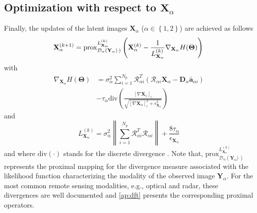 \documentclass[review]{elsarticle}
\newcommand{\Npatch}{N_{\mathrm{p}}}
\begin{document}
\subsection{Optimization with respect to \texorpdfstring{$\mathbf{X}_{\alpha}$}{X}}

Finally, the updates of the latent images $\mathbf{X}_{\alpha}$ ($\alpha \in \left\{1,2\right\}$) are achieved as follows
\begin{equation}
 		\mathbf{X}_{\alpha}^{(k+1)} = \mathrm{prox}^{L_{\mathbf{X}_{\mathrm{\alpha}}}^{(k)}}_{\mathcal{D}_{\mathrm{\alpha}}(\mathbf{Y}_{\mathrm{\alpha}}|\cdot)}\left(\mathbf{X}_{\alpha}^{(k)} - \frac{1}{L_{\mathbf{X}_{\alpha}}^{(k)} }\nabla_{\mathbf{X}_{\alpha}} H(\boldsymbol{\Theta}) \right)
       	\label{eq:latent_Update}\\
\end{equation}
with
\begin{equation}
\begin{aligned}
\nabla_{\mathbf{X}_{\alpha}}H(\boldsymbol{\Theta}) &= \sigma_{\alpha}^2\sum_{i=1}^{\Npatch}\mathcal{R}_{\alpha{i}}^{T}\left(\mathcal{R}_{\alpha{i}}\mathbf{X}_{\alpha} - \mathbf{D}_{\alpha}\bar{\mathbf{a}}_{\alpha{i}}\right) \\
       &- \tau_{\alpha}\mathrm{div}\left( \frac{\left[\nabla\mathbf{X}_{1}\right]_{i}}{\sqrt{\left[\nabla\mathbf{X}_{\alpha}\right]_{i}^{2} + \epsilon_{\mathbf{X}_{\alpha}}^{2}}}\right)
        \label{eq:nabla_latent}
        \end{aligned}
\end{equation}
and
\begin{equation}
		L_{\mathbf{X}_{\mathrm{\alpha}}}^{(k)} = \sigma_{\mathrm{\alpha}}^{2}\left\|\sum_{i=1}^{\Npatch}\mathcal{R}_{\alpha i}^{T}\mathcal{R}_{\alpha i}\right\|+ \frac{8\tau_{\mathrm{\alpha}}}{\epsilon_{\mathbf{X}_{\mathrm{\alpha}}}}
        \label{eq:lip_latent}
\end{equation}
and where $\mathrm{div}(\cdot)$  stands for the discrete divergence \citep{chambolle_algorithm_2004}. Note that, $\mathrm{prox}^{L_{\mathbf{X}_{\mathrm{\alpha}}}^{(k)}}_{\mathcal{D}_{\mathrm{\alpha}}(\mathbf{Y}_{\mathrm{\alpha}}|\cdot)}$ represents the proximal mapping for the divergence measure associated with the likelihood function characterizing the modality of the observed image $\mathbf{Y}_{\alpha}$. For the most common remote sensing modalities, e.g., optical and radar, these divergences are well documented and \ref{ap:dft} presents the corresponding proximal operators.
\end{document}
